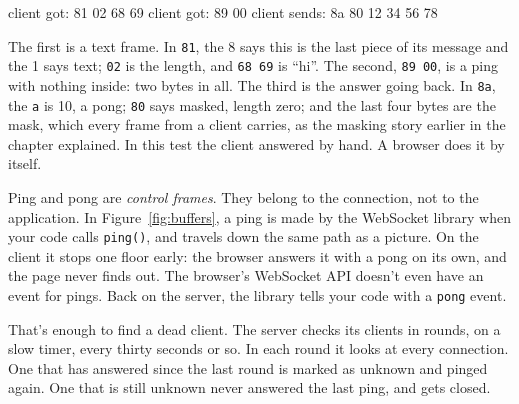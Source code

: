 \begin{terminal}
client got: 81 02 68 69
client got: 89 00
client sends: 8a 80 12 34 56 78
\end{terminal}

The first is a text frame. In \texttt{81}, the 8 says this is the last piece of
its message and the 1 says text; \texttt{02} is the length, and \texttt{68 69}
is ``hi''. The second, \texttt{89 00}, is a ping with nothing inside: two bytes
in all. The third is the answer going back. In \texttt{8a}, the \texttt{a} is
10, a pong; \texttt{80} says masked, length zero; and the last four bytes are
the mask, which every frame from a client carries, as the masking story earlier
in the chapter explained. In this test the client answered by hand. A browser
does it by itself.

Ping and pong are \emph{control frames}. They belong to the connection, not to
the application. In Figure~\ref{fig:buffers}, a ping is made by the WebSocket
library when your code calls \texttt{ping()}, and travels down the same path as
a picture. On the client it stops one floor early: the browser answers it with a
pong on its own, and the page never finds out. The browser's WebSocket API
doesn't even have an event for pings. Back on the server, the library tells your
code with a \texttt{pong} event.

That's enough to find a dead client. The server checks its clients in rounds,
on a slow timer, every thirty seconds or so. In each round it looks at every
connection. One that has answered since the last round is marked as unknown and
pinged again. One that is still unknown never answered the last ping, and gets
closed.

